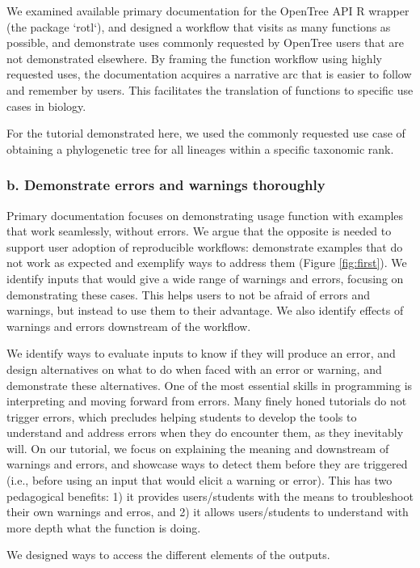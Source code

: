 \documentclass[12pt]{article}
\begin{document}
We examined available primary documentation for the OpenTree API R wrapper (the package `rotl`),
and designed a workflow that visits as many functions as possible, and demonstrate
uses commonly requested by OpenTree users that are not demonstrated elsewhere.
By framing the function workflow using highly requested uses, the documentation acquires a
narrative arc that is easier to follow and remember by users. This facilitates the translation
of functions to specific use cases in biology.

For the tutorial demonstrated here, we used the commonly requested use case of obtaining
a phylogenetic tree for all lineages within a specific taxonomic rank.

\subsubsection*{b. Demonstrate errors and warnings thoroughly}

Primary documentation focuses on demonstrating usage function with examples that
work seamlessly, without errors. We argue that the opposite is needed to support
user adoption of reproducible workflows: demonstrate examples that do not work
as expected and exemplify ways to address them (Figure \ref{fig:first}).
We identify inputs that would give
a wide range of warnings and errors, focusing on demonstrating these cases. This
helps users to not be afraid of errors and warnings, but instead to use them to
their advantage.
We also identify effects of warnings and errors downstream of the workflow.

We identify ways to evaluate inputs to know if they will produce an error, and design
alternatives on what to do when faced with an error or warning, and demonstrate
these alternatives.
One of the most essential skills in programming is interpreting and moving forward
from errors.
Many finely honed tutorials do not trigger errors, which precludes helping students
to develop the tools to understand and address errors when they do encounter them,
as they inevitably will.
On our tutorial, we focus on explaining the meaning and downstream of warnings and errors, and
 showcase ways to detect them before they are triggered (i.e., before using an input
  that would elicit a warning or error). This has two pedagogical benefits:
1) it provides users/students with the means to troubleshoot their own warnings and erros, and
2) it allows users/students to understand with more depth what the function is doing.

We designed ways to access the different elements of the outputs.
\end{document}
